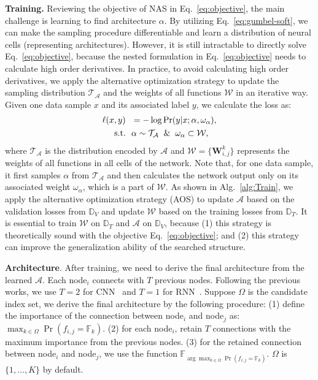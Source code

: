 \documentclass[10pt,twocolumn,letterpaper]{article}
\def\Algref#1{Alg.~\ref{#1}}
\def\Eqref#1{Eq.~\eqref{#1}}
\def\mW{{\bm{W}}}
\def\gA{{\mathcal{A}}}
\def\gT{{\mathcal{T}}}
\def\gW{{\mathcal{W}}}
\def\sD{{\mathbb{D}}}
\def\sF{{\mathbb{F}}}
\begin{document}
{\bf Training.}
Reviewing the objective of NAS in \Eqref{eq:objective}, the main challenge is learning to find architecture $\alpha$.
By utilizing \Eqref{eq:gumbel-soft}, we can make the sampling procedure differentiable and learn a distribution of neural cells (representing architectures).
However, it is still intractable to directly solve \Eqref{eq:objective}, because the nested formulation in \Eqref{eq:objective} needs to calculate high order derivatives.
In practice, to avoid calculating high order derivatives, we apply the alternative optimization strategy to update the sampling distribution $\gT_{\gA}$ and the weights of all functions $\gW$ in an iterative way.
Given one data sample $x$ and its associated label $y$, we calculate the loss as:
\begin{align}\label{eq:loss}
  \ell (x,y)    ~&~= -\log\mathrm{Pr}(y|x; \alpha, \omega_{\alpha}), \\
  \mathrm{s.t.} ~&~ \alpha \sim \gT_{\gA} \hspace{2mm}\&\hspace{2mm}\omega_{\alpha} \subset \gW ,
\end{align}
\noindent where $\gT_{\gA}$ is the distribution encoded by ${\gA}$ and $\gW = \{\mW_{i,j}^{k}\}$ represents the weights of all functions in all cells of the network.
Note that, for one data sample, it first samples $\alpha$ from $\gT_{\gA}$ and then calculates the network output only on its associated weight $\omega_{\alpha}$, which is a part of $\gW$.
As shown in \Algref{alg:Train}, we apply the alternative optimization strategy (AOS) to update $\gA$ based on the validation losses from $\sD_{V}$ and update $\gW$ based on the training losses from $\sD_{T}$.
It is essential to train $\gW$ on $\sD_{T}$ and $\gA$ on $\sD_{V}$, because (1) this strategy is theoretically sound with the objective \Eqref{eq:objective}; and (2) this strategy can improve the generalization ability of the searched structure.








{\bf Architecture}.
After training, we need to derive the final architecture from the learned $\gA$.
Each node$_{i}$ connects with $T$ previous nodes.
Following the previous works, we use $T=2$ for CNN~\cite{Zoph_2018_CVPR,liu2019darts} and $T=1$ for RNN~\cite{pmlr-v80-pham18a,liu2019darts}.
Suppose $\Omega$ is the candidate index set, we derive the final architecture by the following procedure:
(1) define the importance of the connection between node$_{i}$ and node$_{j}$ as: $\max_{k\in\Omega} \mathrm{\Pr}(f_{i,j}=\sF_{k})$.
(2) for each node$_{i}$, retain $T$ connections with the maximum importance from the previous nodes.
(3) for the retained connection between node$_{i}$ and node$_{j}$, we use the function $\sF_{\arg\max_{k\in\Omega} \mathrm{\Pr}(f_{i,j}=\sF_{k})}$.
$\Omega$ is $\{1,...,K\}$ by default.
\end{document}
